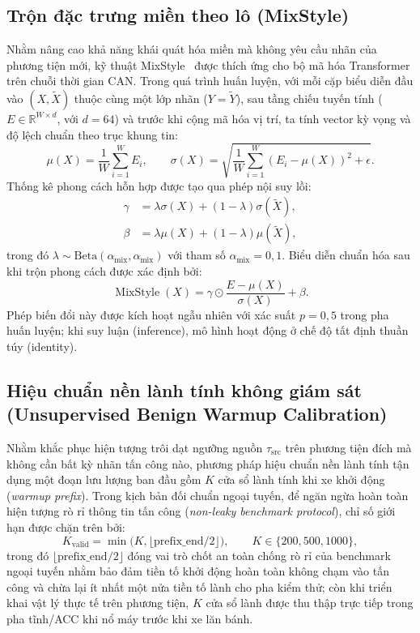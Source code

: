 \documentclass[12pt, a4paper, reqno, oneside]{book}
\begin{document}
\subsection{Trộn đặc trưng miền theo lô (MixStyle)}\label{subsec:method-mixstyle}
Nhằm nâng cao khả năng khái quát hóa miền mà không yêu cầu nhãn của phương tiện mới, kỹ thuật MixStyle~\cite{zhou2021mixstyle} được thích ứng cho bộ mã hóa Transformer trên chuỗi thời gian CAN. Trong quá trình huấn luyện, với mỗi cặp biểu diễn đầu vào $(X, \widetilde{X})$ thuộc cùng một lớp nhãn ($Y = \widetilde{Y}$), sau tầng chiếu tuyến tính ($E \in \mathbb{R}^{W \times d}$, với $d=64$) và trước khi cộng mã hóa vị trí, ta tính vector kỳ vọng và độ lệch chuẩn theo trục khung tin:
\begin{equation}
\mu(X) = \frac{1}{W}\sum_{i=1}^W E_i, \qquad \sigma(X) = \sqrt{\frac{1}{W}\sum_{i=1}^W (E_i - \mu(X))^2 + \epsilon}.
\end{equation}
Thống kê phong cách hỗn hợp được tạo qua phép nội suy lồi:
\begin{align}
\gamma &= \lambda \sigma(X) + (1 - \lambda) \sigma(\widetilde{X}),\\
\beta &= \lambda \mu(X) + (1 - \lambda) \mu(\widetilde{X}),
\end{align}
trong đó $\lambda \sim \text{Beta}(\alpha_{\text{mix}}, \alpha_{\text{mix}})$ với tham số $\alpha_{\text{mix}} = 0{,}1$. Biểu diễn chuẩn hóa sau khi trộn phong cách được xác định bởi:
\begin{equation}
\operatorname{MixStyle}(X) = \gamma \odot \frac{E - \mu(X)}{\sigma(X)} + \beta.
\end{equation}
Phép biến đổi này được kích hoạt ngẫu nhiên với xác suất $p=0{,}5$ trong pha huấn luyện; khi suy luận (inference), mô hình hoạt động ở chế độ tất định thuần túy (identity).

\subsection[Hiệu chuẩn nền lành tính không giám sát]{Hiệu chuẩn nền lành tính không giám sát (Unsupervised Benign Warmup Calibration)}\label{subsec:method-calibration}
Nhằm khắc phục hiện tượng trôi dạt ngưỡng nguồn $\tau_{\text{src}}$ trên phương tiện đích mà không cần bất kỳ nhãn tấn công nào, phương pháp hiệu chuẩn nền lành tính tận dụng một đoạn lưu lượng ban đầu gồm $K$ cửa sổ lành tính khi xe khởi động (\textit{warmup prefix}). Trong kịch bản đối chuẩn ngoại tuyến, để ngăn ngừa hoàn toàn hiện tượng rò rỉ thông tin tấn công (\textit{non-leaky benchmark protocol}), chỉ số giới hạn được chặn trên bởi:
\begin{equation}
K_{\text{valid}} = \min\big(K, \lfloor \mathrm{prefix\_end} / 2 \rfloor\big), \qquad K \in \{200, 500, 1000\},
\end{equation}
trong đó $\lfloor \mathrm{prefix\_end} / 2 \rfloor$ đóng vai trò chốt an toàn chống rò rỉ của benchmark ngoại tuyến nhằm bảo đảm tiền tố khởi động hoàn toàn không chạm vào tấn công và chừa lại ít nhất một nửa tiền tố lành cho pha kiểm thử; còn khi triển khai vật lý thực tế trên phương tiện, $K$ cửa sổ lành được thu thập trực tiếp trong pha tĩnh/ACC khi nổ máy trước khi xe lăn bánh.
\end{document}
